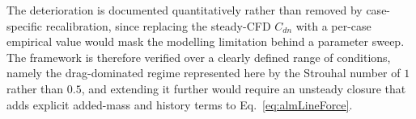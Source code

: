 \noindent
The deterioration is documented quantitatively rather than removed by case-specific recalibration, since replacing the steady-CFD $C_{dn}$ with a per-case empirical value would mask the modelling limitation behind a parameter sweep. The framework is therefore verified over a clearly defined range of conditions, namely the drag-dominated regime represented here by the Strouhal number of $1$ rather than $0.5$, and extending it further would require an unsteady closure that adds explicit added-mass and history terms to Eq.~\eqref{eq:almLineForce}.


